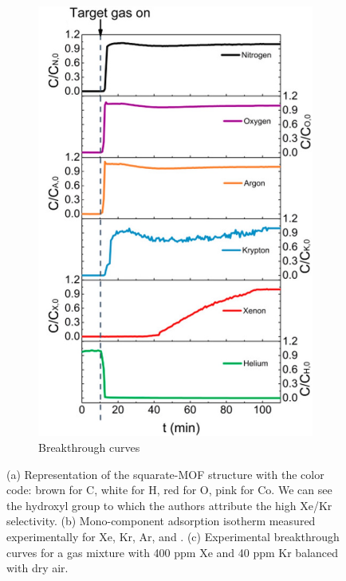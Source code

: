 \documentclass[main]{subfiles}
\begin{document}
\begin{figure}[ht]
\begin{subfigure}[b]{0.25\textwidth}
    \includegraphics[width=\textwidth]{figures/6-perspectives/jacs_li_breakthrough.jpg}
    \caption{Breakthrough curves}\label{fgr:jacs_li_breakthrough}
  \end{subfigure}
  \caption{ (a) Representation of the squarate-MOF  structure with the color code: brown for C, white for H, red for O, pink for Co. We can see the hydroxyl group to which the authors attribute the high Xe/Kr selectivity. (b) Mono-component adsorption isotherm measured experimentally for Xe, Kr, Ar,  and . (c) Experimental breakthrough curves for a gas mixture with 400 ppm Xe and 40 ppm Kr balanced with dry air. }\label{fgr:jacs_li}
\end{figure}
\end{document}
